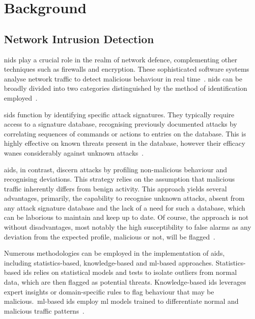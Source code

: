 \chapter{Background}%
\label{chp:background}

\section{Network Intrusion Detection}%
\label{sec:nids}

\gls{nids} play a crucial role in the realm of network defence, complementing
other techniques such as firewalls and encryption. These sophisticated software
systems analyse network traffic to detect malicious behaviour in real
time~\cite{survey2}.
\gls{nids} can be broadly divided into two categories distinguished by the
method of identification employed~\cite{survey1}.

\gls{sids} function by identifying specific attack signatures. They typically
require access to a signature database, recognising previously documented
attacks by correlating sequences of commands or actions to entries on the
database. This is highly effective on known threats present in the database,
however their efficacy wanes considerably against unknown
attacks~\cite{survey1, survey2}.

\gls{aids}, in contrast, discern attacks by profiling non-malicious behaviour
and recognising deviations. This strategy relies on the assumption that
malicious traffic inherently differs from benign activity. This approach yields
several advantages, primarily, the capability to recognise unknown attacks,
absent from any attack signature database and the lack of a need for such a
database, which can be laborious to maintain and keep up to date. Of course,
the approach is not without disadvantages, most notably the high susceptibility
to false alarms as any deviation from the expected profile, malicious or not,
will be flagged~\cite{survey1, survey2}.

Numerous methodologies can be employed in the implementation of \gls{aids},
including statistics-based, knowledge-based and \gls{ml}-based approaches.
Statistics-based \gls{ids} relies on statistical models and tests to isolate
outliers from normal data, which are then flagged as potential threats.
Knowledge-based \gls{ids} leverages expert insights or domain-specific rules to
flag behaviour that may be malicious.\ \gls{ml}-based \gls{ids} employ
\gls{ml} models trained to differentiate normal and malicious traffic
patterns~\cite{survey1}.

